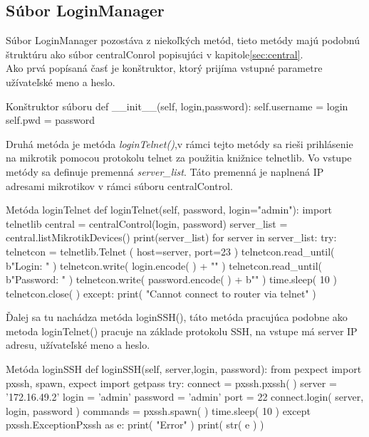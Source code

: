 \subsection{Súbor LoginManager}
Súbor LoginManager pozostáva z niekoľkých metód, tieto metódy majú podobnú štruktúru ako súbor centralConrol popisujúci v kapitole\ref{sec:central}.\\
Ako prvá popísaná časť je konštruktor, ktorý prijíma vstupné parametre užívateľské meno a heslo.\\
\begin{sexylisting}{Konštruktor súboru}
    def __init__(self, login,password):
        self.username = login
        self.pwd = password
\end{sexylisting}
Druhá metóda je metóda \textit{loginTelnet()},v rámci tejto metódy sa rieši prihlásenie na mikrotik pomocou protokolu telnet za použitia knižnice telnetlib. Vo vstupe metódy sa definuje premenná \textit{server_list}. Táto premenná je naplnená IP adresami mikrotikov v rámci súboru centralControl.\\
\begin{sexylisting}{Metóda loginTelnet}
    def loginTelnet(self, password, login="admin"):
        import telnetlib
        central = centralControl(login, password)
        server_list = central.listMikrotikDevices()
        print(server_list)
        for server in server_list:
            try:
                telnetcon = telnetlib.Telnet
                ( host=server, port=23 )
                telnetcon.read_until( b"Login: " )
                telnetcon.write( login.encode( )
                 + "\n" )
                telnetcon.read_until( b"Password: " )
                telnetcon.write( password.encode( )
                 + b"\n" )
                time.sleep( 10 )
                telnetcon.close( )
            except:
                print( "Cannot connect to 
                router via telnet" )
\end{sexylisting}
Ďalej sa tu nachádza metóda loginSSH(), táto metóda pracujúca podobne ako metoda loginTelnet() pracuje na základe protokolu SSH, na vstupe má server IP adresu, užívateľské meno  a heslo. \\
\begin{sexylisting}{Metóda loginSSH}
    def loginSSH(self, server,login, password):
        from pexpect import pxssh, spawn, expect
        import getpass
        try:
            connect = pxssh.pxssh( )
            server = '172.16.49.2'
            login = 'admin'
            password = 'admin'
            port = 22
            connect.login( server, login, 
            password )
            commands = pxssh.spawn( )
            time.sleep( 10 )
        except pxssh.ExceptionPxssh as e:
            print( "Error" )
            print( str( e ) )
\end{sexylisting}
